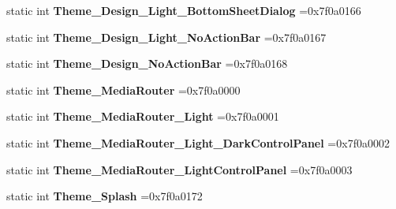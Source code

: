 \begin{DoxyCompactItemize}
static int {\bfseries Theme\+\_\+\+Design\+\_\+\+Light\+\_\+\+Bottom\+Sheet\+Dialog} =0x7f0a0166
\item 
\mbox{\label{classandroid_1_1support_1_1v7_1_1appcompat_1_1R_1_1style_a73d2d283213ce7c2a528509c6da60078}} 
static int {\bfseries Theme\+\_\+\+Design\+\_\+\+Light\+\_\+\+No\+Action\+Bar} =0x7f0a0167
\item 
\mbox{\label{classandroid_1_1support_1_1v7_1_1appcompat_1_1R_1_1style_acea364fa4153ea1c5ad4980deaa1911c}} 
static int {\bfseries Theme\+\_\+\+Design\+\_\+\+No\+Action\+Bar} =0x7f0a0168
\item 
\mbox{\label{classandroid_1_1support_1_1v7_1_1appcompat_1_1R_1_1style_a72f7c42c4c1fc96b29846a5accf5bc3b}} 
static int {\bfseries Theme\+\_\+\+Media\+Router} =0x7f0a0000
\item 
\mbox{\label{classandroid_1_1support_1_1v7_1_1appcompat_1_1R_1_1style_a623e709ccf80ae1aee0986d39598c82c}} 
static int {\bfseries Theme\+\_\+\+Media\+Router\+\_\+\+Light} =0x7f0a0001
\item 
\mbox{\label{classandroid_1_1support_1_1v7_1_1appcompat_1_1R_1_1style_a30e9647006c218ad78ee6399b8e3ec84}} 
static int {\bfseries Theme\+\_\+\+Media\+Router\+\_\+\+Light\+\_\+\+Dark\+Control\+Panel} =0x7f0a0002
\item 
\mbox{\label{classandroid_1_1support_1_1v7_1_1appcompat_1_1R_1_1style_a8e0e6e253b9166dbebf246dfe4abeba1}} 
static int {\bfseries Theme\+\_\+\+Media\+Router\+\_\+\+Light\+Control\+Panel} =0x7f0a0003
\item 
\mbox{\label{classandroid_1_1support_1_1v7_1_1appcompat_1_1R_1_1style_a5da98719070e50e7224bc4470450860f}} 
static int {\bfseries Theme\+\_\+\+Splash} =0x7f0a0172
\item 
\mbox{\label{classandroid_1_1support_1_1v7_1_1appcompat_1_1R_1_1style_a847d285367cc90c42d5eeadf9b62003d}} 

\end{DoxyCompactItemize}
